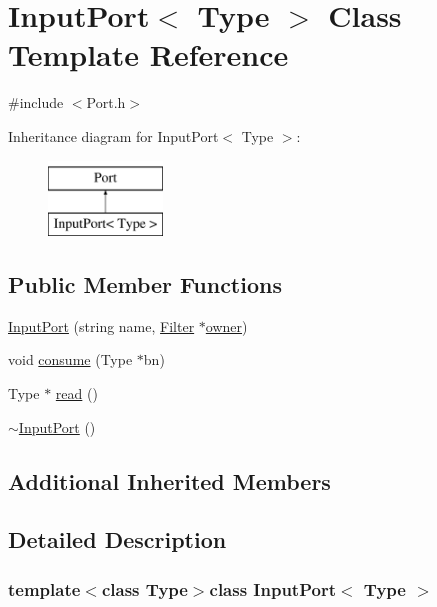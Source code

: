 \hypertarget{classInputPort}{\section{Input\-Port$<$ Type $>$ Class Template Reference}
\label{classInputPort}
}


{\ttfamily \#include $<$Port.\-h$>$}

Inheritance diagram for Input\-Port$<$ Type $>$\-:\begin{figure}[H]
\begin{center}
\leavevmode
\includegraphics[height=2.000000cm]{classInputPort}
\end{center}
\end{figure}
\subsection*{Public Member Functions}
\begin{DoxyCompactItemize}
\item 
\hyperlink{classInputPort_ae0b8fba94c6ff226d5ef27a945e71d36}{Input\-Port} (string name, \hyperlink{classFilter}{Filter} $\ast$\hyperlink{classPort_a09f3613b92c0d46d0aa8c3239102a3ca}{owner})
\item 
void \hyperlink{classInputPort_a1a2a37ffa8834ff478ea94458ee34b4f}{consume} (Type $\ast$bn)
\item 
Type $\ast$ \hyperlink{classInputPort_a1022cb16047cf6f8d5510fbdd187333c}{read} ()
\item 
\hyperlink{classInputPort_ab8ca4f0de1d52859f6b69fbe00ec7a71}{$\sim$\-Input\-Port} ()
\end{DoxyCompactItemize}
\subsection*{Additional Inherited Members}


\subsection{Detailed Description}
\subsubsection*{template$<$class Type$>$class Input\-Port$<$ Type $>$}

